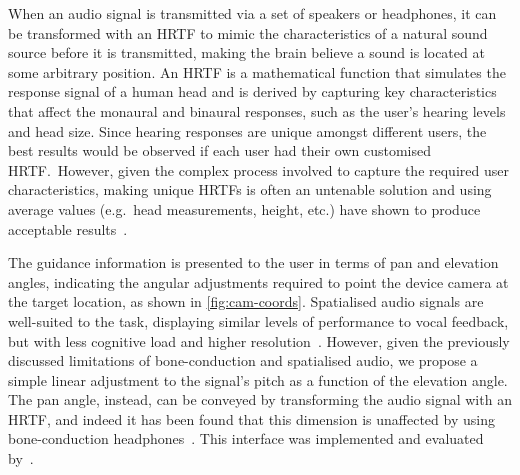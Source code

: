 \documentclass[acmsmall]{acmart}
\begin{document}
When an audio signal is transmitted via a set of speakers or headphones, it can be transformed with an HRTF to mimic the characteristics of a natural sound source before it is transmitted, making the brain believe a sound is located at some arbitrary position.
An HRTF is a mathematical function that simulates the response signal of a human head and is derived by capturing key characteristics that affect the monaural and binaural responses, such as the user's hearing levels and head size.
Since hearing responses are unique amongst different users, the best results would be observed if each user had their own customised HRTF.\
However, given the complex process involved to capture the required user characteristics, making unique HRTFs is often an untenable solution and using average values (e.g.\ head measurements, height, etc.) have shown to produce acceptable results~\citep{gardner1995hrtf}.

The guidance information is presented to the user in terms of pan and elevation angles, indicating the angular adjustments required to point the device camera at the target location, as shown in \cref{fig:cam-coords}.
Spatialised audio signals are well-suited to the task, displaying similar levels of performance to vocal feedback, but with less cognitive load and higher resolution~\citep{klatzky2006cognitive}.
However, given the previously discussed limitations of bone-conduction and spatialised audio, we propose a simple linear adjustment to the signal's pitch as a function of the elevation angle. 
The pan angle, instead, can be conveyed by transforming the audio signal with an HRTF, and indeed it has been found that this dimension is unaffected by using bone-conduction headphones~\citep{schonstein2008comparison,macdonald2006spatial,stanley2006lateralization,lock2019bone}. 
This interface was implemented and evaluated by~\citet{lock2019bone}.
\end{document}
